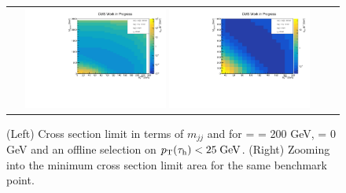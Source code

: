\begin{figure}[tbh!]
	\centering
	\begin{tabular}{cc}
		\includegraphics[width=0.45\textwidth]{analysis/pics/JetInvMass_vs_MET_xsec_chi200_lsp000_taupt25.pdf}
		\includegraphics[width=0.45\textwidth]{analysis/pics/JetInvMass_vs_MET_xsec_chi200_lsp000_taupt25_zoom.pdf} 		
	\end{tabular}
	\caption{(Left) Cross section limit in terms of $m_{jj}$ and \met for \charginopm = \neutralinotwo = 200 GeV, \neutralinoone = 0 GeV and an offline selection on $p_{\text{T}}(\tau_{\text{h}}) <  25\;\text{Ge}\kern-0.06667em\text{V}$. (Right) Zooming into the minimum cross section limit area for the same benchmark point.}
	\label{fig::JetInvMass_vs_MET_xsec_chi200_lsp000_taupt25}
\end{figure}


